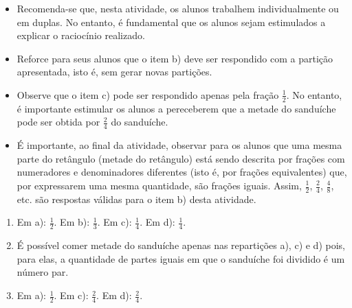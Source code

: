 \begin{multicols}{2}
\begin{objetivos}[code={\setcounter{tcb@cnt@objetivos}{0}}, label=chap4-ativ1]{}{}
\begin{itemize}
\end{itemize} %
\end{objetivos}

\begin{orientacoes}{}{}

\begin{itemize} %
    \item       Recomenda-se que, nesta atividade, os alunos trabalhem
individualmente ou em duplas. No entanto, é fundamental que os alunos sejam
estimulados a explicar o raciocínio realizado.
    \item       Reforce para seus alunos que o item b) deve ser respondido com a
partição apresentada, isto é, sem gerar novas partições.
    \item       Observe que o item c) pode ser respondido apenas pela fração
  $\frac{1}{2}$. No entanto, é importante estimular os alunos a pereceberem que
a metade do sanduíche pode ser obtida por       $\frac{2}{4}$       do
sanduíche.
    \item       É importante, ao final da atividade, observar para os alunos que
uma mesma parte do retângulo (metade do retângulo) está sendo descrita por
frações com numeradores e denominadores diferentes (isto é, por frações
equivalentes) que, por expressarem uma mesma quantidade, são frações iguais. Assim,       $\frac{1}{2}$,       $\frac{2}{4}$,
$\frac{4}{8}$, etc. são respostas válidas para o item b) desta atividade.
\end{itemize} %




\end{orientacoes}


\begin{solucao}[code={\setcounter{tcb@cnt@solucao}{0}}]{}{}
\begin{enumerate} [\quad a)] %
    \item       Em a):       $\frac{1}{2}$. Em b):       $\frac{1}{3}$. Em c):
    $\frac{1}{4}$. Em d):       $\frac{1}{4}$.
    \item       É possível comer metade do sanduíche apenas nas repartições a),
c) e d) pois, para elas, a quantidade de partes iguais em que o sanduíche foi
dividido é um número par.
    \item       Em a):       $\frac{1}{2}$. Em c):       $\frac{2}{4}$. Em d):
    $\frac{2}{4}$.
\end{enumerate} %


\end{solucao}
\end{multicols}
